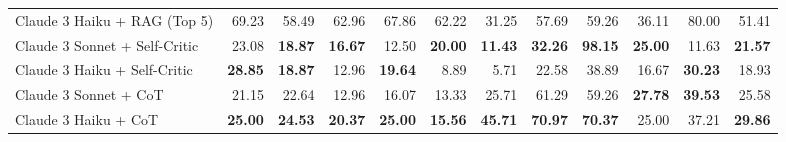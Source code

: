 \begin{table}[H]
{\begin{tabular}{lrrrrrrrrrrr}
Claude 3 Haiku + RAG (Top 5) & 69.23 & 58.49 & 62.96 & 67.86 & 62.22 & 31.25 & 57.69 & 59.26 & 36.11 & 80.00 & 51.41 \\
\rowcolor{Gray}
Claude 3 Sonnet + Self-Critic & 23.08 & \textbf{18.87} & \textbf{16.67} & 12.50 & \textbf{20.00} & \textbf{11.43} & \textbf{32.26} & \textbf{98.15} & \textbf{25.00} & 11.63 & \textbf{21.57} \\
\rowcolor{Gray}
Claude 3 Haiku + Self-Critic & \textbf{28.85} & \textbf{18.87} & 12.96 & \textbf{19.64} & 8.89 & 5.71 & 22.58 & 38.89 & 16.67 & \textbf{30.23} & 18.93 \\
Claude 3 Sonnet + CoT & 21.15 & 22.64 & 12.96 & 16.07 & 13.33 & 25.71 & 61.29 & 59.26 & \textbf{27.78} & \textbf{39.53} & 25.58 \\
Claude 3 Haiku + CoT & \textbf{25.00} & \textbf{24.53} & \textbf{20.37} & \textbf{25.00} & \textbf{15.56} & \textbf{45.71} & \textbf{70.97} & \textbf{70.37} & 25.00 & 37.21 & \textbf{29.86} \\
\bottomrule
\end{tabular}
}

 \label{tab:explicit_20topics_300}
\end{table}
